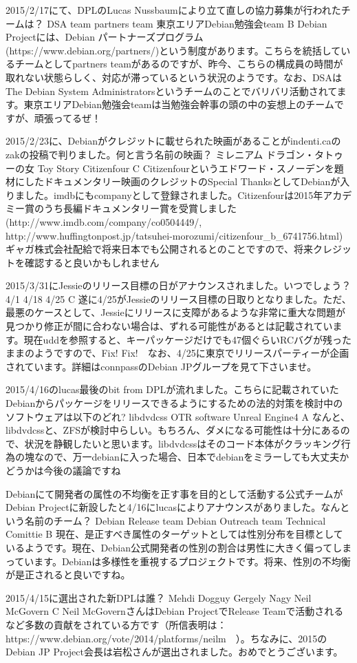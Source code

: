 %

\santaku
{2015/2/17にて、DPLのLucas Nussbaumにより立て直しの協力募集が行われたチームは？}
{DSA team}
{partners team}
{東京エリアDebian勉強会team}
{B}
{Debian Projectには、Debian パートナーズプログラム(https://www.debian.org/partners/)という制度があります。こちらを統括しているチームとしてpartners teamがあるのですが、昨今、こちらの構成員の時間が取れない状態らしく、対応が滞っているという状況のようです。なお、DSAはThe Debian System Administratorsというチームのことでバリバリ活動されてます。東京エリアDebian勉強会teamは当勉強会幹事の頭の中の妄想上のチームですが、頑張ってるぜ！}

\santaku
{2015/2/23に、Debianがクレジットに載せられた映画があることがindenti.caのzakの投稿で判りました。何と言う名前の映画？}
{ミレニアム ドラゴン・タトゥーの女}
{Toy Story}
{Citizenfour}
{C}
{Citizenfourというエドワード・スノーデンを題材にしたドキュメンタリー映画のクレジットのSpecial ThanksとしてDebianが入りました。imdbにもcompanyとして登録されました。Citizenfourは2015年アカデミー賞のうち長編ドキュメンタリー賞を受賞しました(http://www.imdb.com/company/co0504449/, http://www.huffingtonpost.jp/tatsuhei-morozumi/citizenfour\_b\_6741756.html)ギャガ株式会社配給で将来日本でも公開されるとのことですので、将来クレジットを確認すると良いかもしれません}

\santaku
{2015/3/31にJessieのリリース目標の日がアナウンスされました。いつでしょう？}
{4/1}
{4/18}
{4/25}
{C}
{遂に4/25がJessieのリリース目標の日取りとなりました。ただ、最悪のケースとして、Jessieにリリースに支障があるような非常に重大な問題が見つかり修正が間に合わない場合は、ずれる可能性があるとは記載されています。現在uddを参照すると、キーパッケージだけでも47個ぐらいRCバグが残ったままのようですので、Fix! Fix!　なお、4/25に東京でリリースパーティーが企画されています。詳細はconnpassのDebian JPグループを見て下さいませ。}

\santaku
{2015/4/16のlucas最後のbit from DPLが流れました。こちらに記載されていたDebianからパッケージをリリースできるようにするための法的対策を検討中のソフトウェアは以下のどれ?}
{libdvdcss}
{OTR software}
{Unreal Engine4}
{A}
{なんと、libdvdcssと、ZFSが検討中らしい。もちろん、ダメになる可能性は十分にあるので、状況を静観したいと思います。libdvdcssはそのコード本体がクラッキング行為の塊なので、万一debianに入った場合、日本でdebianをミラーしても大丈夫かどうかは今後の議論ですね}

\santaku
{Debianにて開発者の属性の不均衡を正す事を目的として活動する公式チームがDebian Projectに新設したと4/16にlucasによりアナウンスがありました。なんという名前のチーム？}
{Debian Release team}
{Debian Outreach team}
{Technical Comittie}
{B}
{現在、是正すべき属性のターゲットとしては性別分布を目標としているようです。現在、Debian公式開発者の性別の割合は男性に大きく偏ってしまっています。Debianは多様性を重視するプロジェクトです。将来、性別の不均衡が是正されると良いですね。}

\santaku
{2015/4/15に選出された新DPLは誰？}
{Mehdi Dogguy}
{Gergely Nagy}
{Neil McGovern}
{C}
{Neil McGovernさんはDebian ProjectでRelease Teamで活動されるなど多数の貢献をされている方です（所信表明は：https://www.debian.org/vote/2014/platforms/neilm　）。ちなみに、2015のDebian JP Project会長は岩松さんが選出されました。おめでとうございます。}






